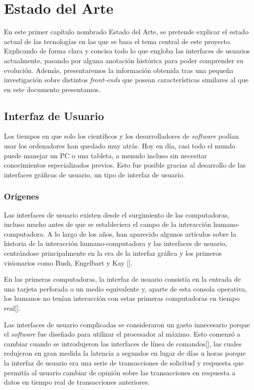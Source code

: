 \chapter{Estado del Arte}\label{chapter:state-of-the-art}

En este primer capítulo nombrado Estado del Arte, se pretende explicar el estado actual de las tecnologías en las que se basa el tema central de este proyecto. Explicando de forma clara y concisa todo lo que engloba las interfaces de usuarios actualmente, pasando por alguna anotación histórica para poder comprender su evolución. Además, presentaremos la información obtenida tras una pequeña investigación sobre distintos \textit{front-ends} que posean características similares al que en este documento presentamos.

\section{Interfaz de Usuario}

Los tiempos en que solo los científicos y los desarrolladores de \textit{software} podían usar los ordenadores han quedado muy atrás. Hoy en día, casi todo el mundo puede manejar un PC o una tableta, a menudo incluso sin necesitar conocimientos especializados previos. Esto fue posible gracias al desarrollo de las interfaces gráficas de usuario, un tipo de interfaz de usuario.

\subsection{Orígenes}

Las interfaces de usuario existen desde el surgimiento de las computadoras, incluso mucho antes de que se estableciera el campo de la interacción humano-computadora. A lo largo de los años, han aparecido algunos artículos sobre la historia de la interacción humano-computadora y las interfaces de usuario, centrándose principalmente en la era de la interfaz gráfica y los primeros visionarios como Bush, Engelbart y Kay [\cite{5,6,7,8}].

En las primeras computadoras, la interfaz de usuario consistía en la entrada de una tarjeta perforada o un medio equivalente y, aparte de esta consola operativa, los humanos no tenían interacción con estas primeras computadoras en tiempo real[\cite{6,8}].

Las interfaces de usuario complicadas se consideraron un gasto innecesario porque el \textit{software} fue diseñado para utilizar el procesador al máximo. Esto comenzó a cambiar cuando se introdujeron las interfaces de línea de comandos[\cite{7}], las cuales redujeron en gran medida la latencia a segundos en lugar de días u horas porque la interfaz de usuario era una serie de transacciones de solicitud y respuesta que permitía al usuario cambiar de opinión sobre las transacciones en respuesta a datos en tiempo real de transacciones anteriores.

